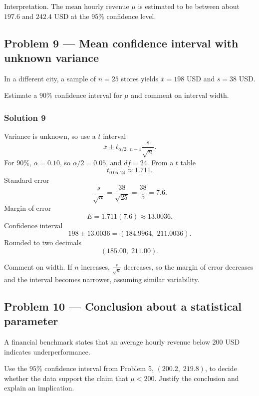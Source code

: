 Interpretation. The mean hourly revenue $\mu$ is estimated to be between about $197.6$ and $242.4$ USD at the $95\%$ confidence level.


\subsection*{Problem 9 — Mean confidence interval with unknown variance}

In a different city, a sample of $n = 25$ stores yields $\bar{x} = 198$ USD and $s = 38$ USD.

Estimate a $90\%$ confidence interval for $\mu$ and comment on interval width.

\subsubsection*{Solution 9}

Variance is unknown, so use a $t$ interval
\[
\bar{x} \pm t_{\alpha/2,\;n-1}\frac{s}{\sqrt{n}}.
\]
For $90\%$, $\alpha = 0.10$, so $\alpha/2 = 0.05$, and $df = 24$.
From a $t$ table
\[
t_{0.05,24} \approx 1.711.
\]
Standard error
\[
\frac{s}{\sqrt{n}} = \frac{38}{\sqrt{25}} = \frac{38}{5} = 7.6.
\]
Margin of error
\[
E = 1.711(7.6) \approx 13.0036.
\]
Confidence interval
\[
198 \pm 13.0036 = (184.9964,\;211.0036).
\]
Rounded to two decimals
\[
(185.00,\;211.00).
\]

Comment on width. If $n$ increases, $\frac{s}{\sqrt{n}}$ decreases, so the margin of error decreases and the interval becomes narrower, assuming similar variability.


\subsection*{Problem 10 — Conclusion about a statistical parameter}

A financial benchmark states that an average hourly revenue below $200$ USD indicates underperformance.

Use the $95\%$ confidence interval from Problem 5, $(200.2,\;219.8)$, to decide whether the data support the claim that $\mu < 200$. Justify the conclusion and explain an implication.

